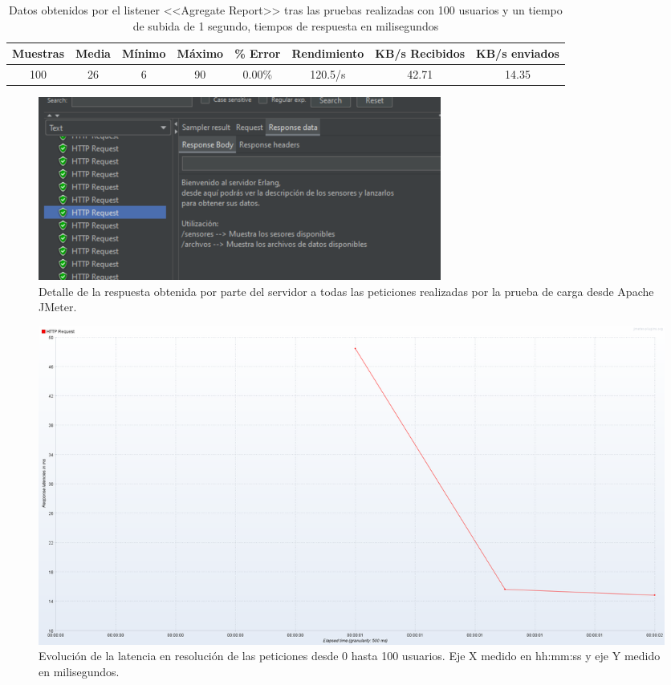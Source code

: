 \begin{table}[h]
\begin{center}
\sffamily\small
\begin{tabular}{|c|c|c|c|c|c|c|c|}
\rowcolor{gray!20}
\hline
Muestras & Media & Mínimo & Máximo & \% Error & Rendimiento & KB/s Recibidos & KB/s enviados \\
\hline
100 & 26 & 6 & 90 & 0.00\% & 120.5/s & 42.71 & 14.35 \\
\hline
\end{tabular}
\caption[Salida <<Agregate Report>> con 100 hilos]{Datos obtenidos por el listener <<Agregate Report>> tras las pruebas realizadas con 100 usuarios y un tiempo de subida de 1 segundo, tiempos de respuesta en milisegundos}%
\label{tab:100User}
\end{center}
\end{table}


\begin{figure}[h]
\centering
\includegraphics{images/respuestaJmeter.png}
\caption[Detalles de una HTTP Request obtenida]{Detalle de la respuesta obtenida por parte del servidor a todas las peticiones realizadas por la prueba de carga desde Apache JMeter.}%
\label{fig:respuestaJmeter}
\end{figure}


\begin{figure}[h]
\centering
\includegraphics[scale=0.28]{images/latenciaGraf100.png}
\caption[Evolución de la latencia con 100 usuarios]{Evolución de la latencia en resolución de las peticiones desde 0 hasta 100 usuarios. Eje X medido en {\ttfamily hh:mm:ss} y eje Y medido en milisegundos.}%
\label{fig:latencia100}
\end{figure}



